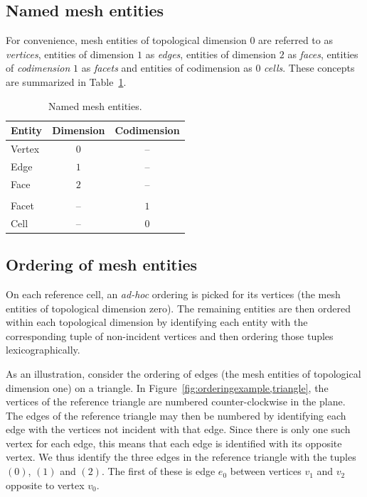 \subsection{Named mesh entities}

For convenience, mesh entities of topological dimension $0$ are
referred to as \emph{vertices}, entities of dimension $1$
as \emph{edges}, entities of dimension $2$ as \emph{faces}, entities of
\emph{codimension} $1$ as \emph{facets} and entities of codimension as
$0$ \emph{cells}. These concepts are summarized in
Table~\ref{tab:entities}.

\begin{table}[H]
\linespread{1.2}\selectfont
  \begin{center}
    \begin{tabular}{|l|c|c|}
      \hline
      Entity & Dimension & Codimension \\
      \hline
      Vertex & $0$       & -- \\
      Edge   & $1$       & -- \\
      Face   & $2$       & -- \\
      & & \\
      Facet  & --      &  $1$ \\
      Cell   & --      &  $0$ \\
      \hline
    \end{tabular}
    \caption{Named mesh entities.}
    \label{tab:entities}
  \end{center}
\end{table}

\subsection{Ordering of mesh entities}

On each reference cell, an \emph{ad-hoc} ordering is picked for its
vertices (the mesh entities of topological dimension zero). The
remaining entities are then ordered within each topological dimension
by identifying each entity with the corresponding tuple of
non-incident vertices and then ordering those tuples
lexicographically.

As an illustration, consider the ordering of edges (the mesh entities
of topological dimension one) on a triangle. In
Figure~\ref{fig:orderingexample,triangle}, the vertices of the
reference triangle are numbered counter-clockwise in the plane. The
edges of the reference triangle may then be numbered by identifying
each edge with the vertices not incident with that edge. Since there
is only one such vertex for each edge, this means that each edge is
identified with its opposite vertex. We thus identify the three edges
in the reference triangle with the tuples $(0)$, $(1)$ and $(2)$. The
first of these is edge $e_0$ between vertices $v_1$ and $v_2$ opposite
to vertex $v_0$.

